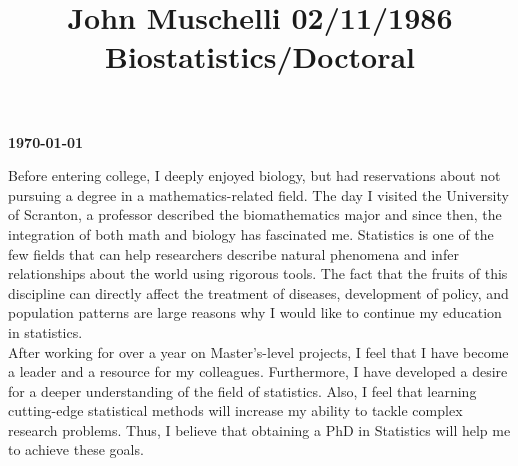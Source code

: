 \documentclass[12pt]{article}
\title{John Muschelli  \hfill 02/11/1986 \hfill Biostatistics/Doctoral} %
\begin{document}
\newbox\TempBox \newbox\TempBoxA
%
\def\undertilde#1{%
  \ifmmode\setbox\TempBox=\hbox{$#1$}\else\setbox\TempBox=\hbox{#1}\fi%
  \setbox\TempBoxA=\hbox to \wd\TempBox{\hss\char'176\hss}%
  \rlap{\copy\TempBox}\smash{\lower9pt\hbox{\copy\TempBoxA}}%
}
%
\def\undertildelow#1{%
  \ifmmode\setbox\TempBox=\hbox{$#1$}\else\setbox\TempBox=\hbox{#1}\fi%
  \setbox\TempBoxA=\hbox to \wd\TempBox{\hss\char'176\hss}%
  \rlap{\copy\TempBox}\smash{\lower10pt\hbox{\copy\TempBoxA}}%
}




\hfill {\bf \today\\}

Before entering college, I deeply enjoyed biology, but had reservations about not pursuing a degree in a mathematics-related field.   The day I visited the University of Scranton, a professor described the biomathematics major and since then, the integration of both math and biology has fascinated me.  Statistics is one of the few fields that can help researchers describe natural phenomena and infer relationships about the world using rigorous tools. The fact that the fruits of this discipline can directly affect the treatment of diseases, development of policy, and population patterns are large reasons why I would like to continue my education in statistics. \\
 
After working for over a year on Master's-level projects, I feel that I have become a leader and a resource for my colleagues. Furthermore, I have developed a desire for a deeper understanding of the field of statistics.   Also, I feel that learning cutting-edge statistical methods will increase my ability to tackle complex research problems.  Thus, I believe that obtaining a PhD in Statistics will help me to achieve these goals. \\
\end{document}
